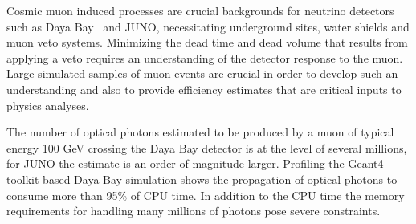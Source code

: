 \documentclass[a4paper]{jpconf}
\begin{document}

Cosmic muon induced processes are crucial backgrounds for neutrino
detectors such as Daya Bay~\cite{dyb} and JUNO\cite{juno}, 
necessitating underground sites, water shields and muon veto systems\cite{dybmuon}.
Minimizing the dead time and dead volume that results from applying 
a veto requires an understanding of the detector response to the muon.
Large simulated samples of muon events are crucial in order to 
develop such an understanding and also to provide efficiency estimates 
that are critical inputs to physics analyses.

The number of optical photons estimated to be produced by a muon of 
typical energy 100 GeV crossing the Daya Bay detector is at the level of several millions, 
for JUNO the estimate is an order of magnitude larger. 
Profiling the Geant4 toolkit based Daya Bay simulation 
shows the propagation of optical photons to consume more than 95\% of CPU time. 
In addition to the CPU time the memory requirements for handling many millions 
of photons pose severe constraints.  

%
%
\end{document}
